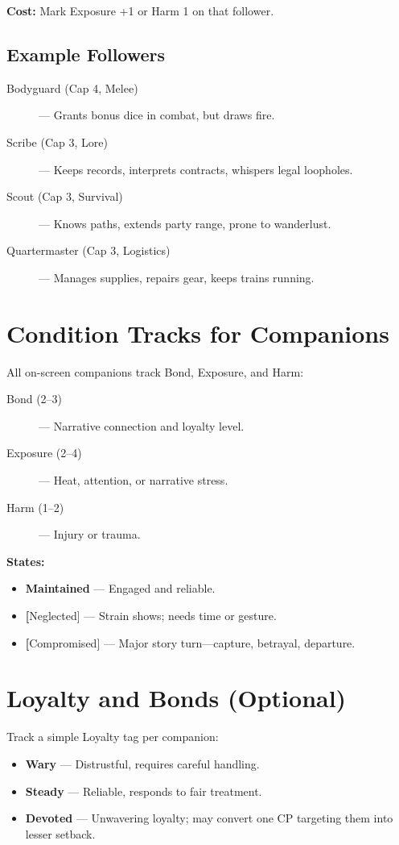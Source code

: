 \textbf{Cost:} Mark Exposure +1 or Harm 1 on that follower.

\subsection*{Example Followers}

\begin{description}
  \item[Bodyguard (Cap 4, Melee)] — Grants bonus dice in combat, but draws fire.
  \item[Scribe (Cap 3, Lore)] — Keeps records, interprets contracts, whispers legal loopholes.
  \item[Scout (Cap 3, Survival)] — Knows paths, extends party range, prone to wanderlust.
  \item[Quartermaster (Cap 3, Logistics)] — Manages supplies, repairs gear, keeps trains running.
\end{description}

\section{Condition Tracks for Companions}

All on-screen companions track Bond, Exposure, and Harm:

\begin{description}
  \item[Bond (2–3)] — Narrative connection and loyalty level.
  \item[Exposure (2–4)] — Heat, attention, or narrative stress.
  \item[Harm (1–2)] — Injury or trauma.
\end{description}

\textbf{States:}
\begin{itemize}
  \item \textbf{Maintained} — Engaged and reliable.
  \item \textbf[Neglected] — Strain shows; needs time or gesture.
  \item \textbf[Compromised] — Major story turn—capture, betrayal, departure.
\end{itemize}

\section{Loyalty and Bonds (Optional)}

Track a simple Loyalty tag per companion:
\begin{itemize}
  \item \textbf{Wary} — Distrustful, requires careful handling.
  \item \textbf{Steady} — Reliable, responds to fair treatment.
  \item \textbf{Devoted} — Unwavering loyalty; may convert one CP targeting them into lesser setback.
\end{itemize}

